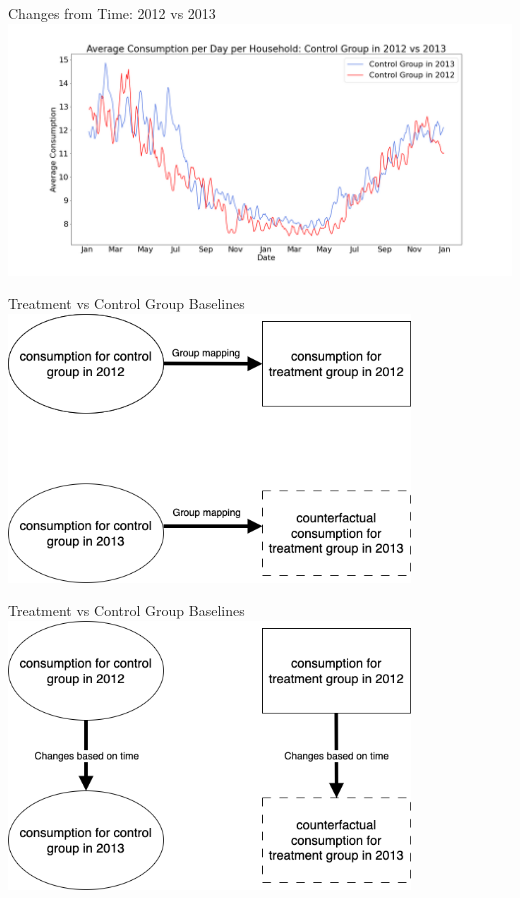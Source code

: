 \documentclass{beamer}
\begin{document}
\begin{frame}{Changes from Time: 2012 vs 2013}
  \centering
  \includegraphics[width=1\textwidth]{images/yoy-changes-control-group.png}
\end{frame}

\begin{frame}{Treatment vs Control Group Baselines}
  \centering
  \includegraphics[width=0.8\textwidth]{images/group-mapping.png}
\end{frame}

\begin{frame}{Treatment vs Control Group Baselines}
  \centering
  \includegraphics[width=0.8\textwidth]{images/yoy-mapping.png}
\end{frame}
\end{document}
